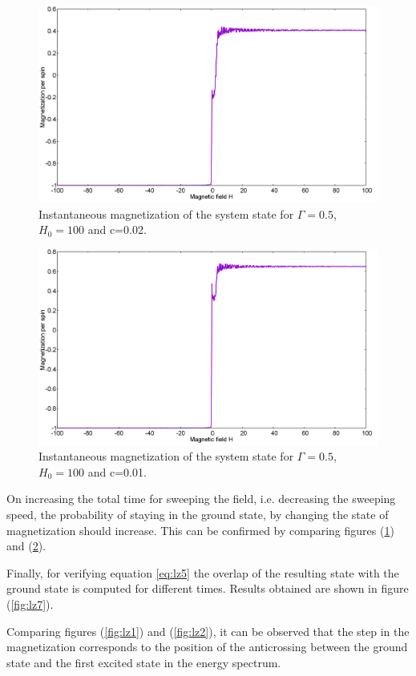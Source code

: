 \documentclass[12]{article}
\begin{document}
\begin{figure}[H]
  \centering
    \includegraphics[scale=0.3]{Mag_13_H100.png}
    \caption{Instantaneous magnetization of the system state for $\Gamma=0.5$, $H_0=100$ and c=0.02.}
  \label{fig:lz5}
 \end{figure}
 \begin{figure}[H]
    \includegraphics[scale=0.3]{Mag_9_H100.png}
    \caption{Instantaneous magnetization of the system state for $\Gamma=0.5$, $H_0=100$ and c=0.01.}
  \label{fig:lz6}
\end{figure}
On increasing the total time for sweeping the field, i.e. decreasing the sweeping speed, the probability of staying in the ground state, by changing the state of magnetization should increase. This can be confirmed by comparing figures (\ref{fig:lz5}) and (\ref{fig:lz6}).

Finally, for verifying equation {\ref{eq:lz5}} the overlap of the resulting state with the ground state is computed for different times. Results obtained are shown in figure (\ref{fig:lz7}). 

Comparing figures (\ref{fig:lz1}) and (\ref{fig:lz2}), it can be observed that the step in the magnetization corresponds to the position of the anticrossing between the ground state and the first excited state in the energy spectrum.\\
\end{document}
